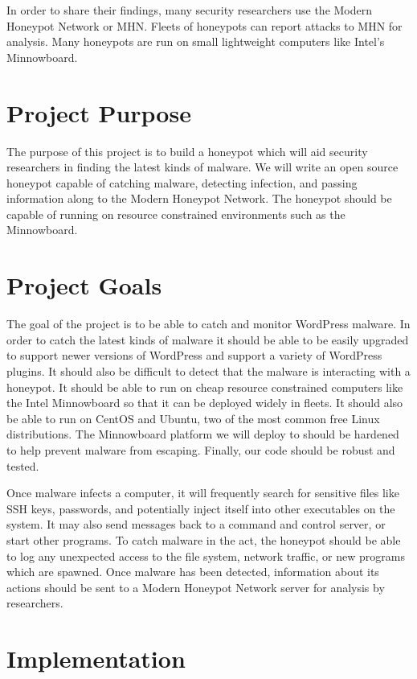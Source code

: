 \documentclass[10pt,conference,draftclsnofoot,onecolumn]{IEEEtran}
\begin{document}
In order to share their  findings, many security researchers use the Modern Honeypot Network or MHN. Fleets of honeypots can report attacks to MHN for analysis. Many honeypots are run on small lightweight computers like Intel’s Minnowboard.

\section{Project Purpose}
The purpose of this project is to build a honeypot which will aid security researchers in finding the latest kinds of malware. We will write an open source honeypot capable of catching malware, detecting infection, and passing information along to the Modern Honeypot Network. The honeypot should be capable of running on resource constrained environments such as the Minnowboard.

\section{Project Goals}
The goal of the project is to be able to catch and monitor WordPress malware. In order to catch the latest kinds of malware it should be able to be easily upgraded to support newer versions of WordPress and support a variety of WordPress plugins. It should also be difficult to detect that the malware is interacting with a honeypot. It should be able to run on cheap resource constrained computers like the Intel Minnowboard so that it can be deployed widely in fleets. It should also be able to run on CentOS and Ubuntu, two of the most common free Linux distributions. The Minnowboard platform we will deploy to should be hardened to help prevent malware from escaping. Finally, our code should be robust and tested. 

Once malware infects a computer, it will frequently search for sensitive files like SSH keys, passwords, and potentially inject itself into other executables on the system. It may also send messages back to a command and control server, or start other programs. To catch malware in the act, the honeypot should be able to log any unexpected access to the file system, network traffic, or new programs which are spawned. Once malware has been detected, information about its actions should be sent to a Modern Honeypot Network server for analysis by researchers.

\section{Implementation}
\end{document}
